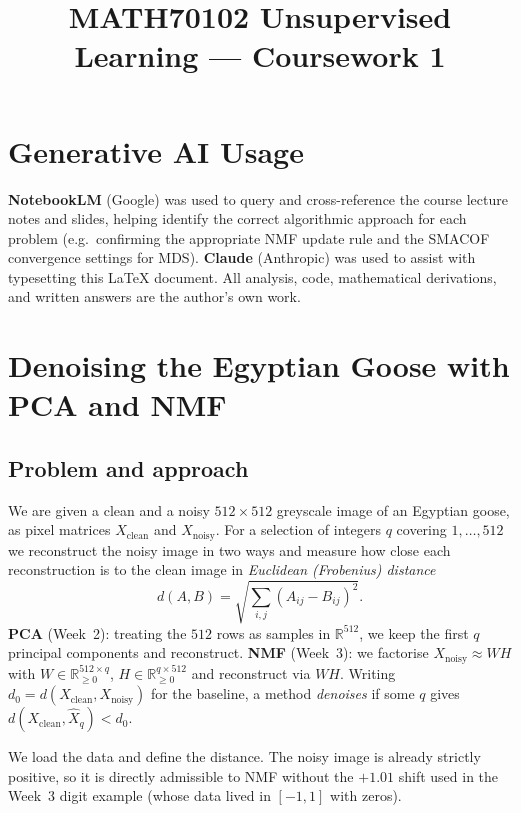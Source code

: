 \documentclass[10pt,a4paper]{article}
\title{\vspace{-1.2cm}\textbf{MATH70102 Unsupervised Learning --- Coursework 1}}
\author{}
\date{}
\begin{document}
\maketitle
\vspace{-1.0cm}

\section*{Generative AI Usage}

\textbf{NotebookLM} (Google) was used to query and cross-reference the course lecture notes and slides, helping identify the correct algorithmic approach for each problem (e.g.\ confirming the appropriate NMF update rule and the SMACOF convergence settings for MDS). \textbf{Claude} (Anthropic) was used to assist with typesetting this \LaTeX{} document. All analysis, code, mathematical derivations, and written answers are the author's own work.

\section{Denoising the Egyptian Goose with PCA and NMF}

\subsection{Problem and approach}

We are given a clean and a noisy $512\times512$ greyscale image of an Egyptian goose, as pixel matrices $X_{\text{clean}}$ and $X_{\text{noisy}}$. For a selection of integers $q$ covering $1,\dots,512$ we reconstruct the noisy image in two ways and measure how close each reconstruction is to the clean image in \emph{Euclidean (Frobenius) distance}
\[
  d(A,B)=\sqrt{\textstyle\sum_{i,j}(A_{ij}-B_{ij})^2}.
\]
\textbf{PCA} (Week~2): treating the $512$ rows as samples in $\mathbb{R}^{512}$, we keep the first $q$ principal components and reconstruct. \textbf{NMF} (Week~3): we factorise $X_{\text{noisy}}\approx WH$ with $W\in\mathbb{R}^{512\times q}_{\ge 0}$, $H\in\mathbb{R}^{q\times 512}_{\ge 0}$ and reconstruct via $WH$. Writing $d_0=d(X_{\text{clean}},X_{\text{noisy}})$ for the baseline, a method \emph{denoises} if some $q$ gives $d(X_{\text{clean}},\hat X_q)<d_0$.

We load the data and define the distance. The noisy image is already strictly positive, so it is directly admissible to NMF without the $+1.01$ shift used in the Week~3 digit example (whose data lived in $[-1,1]$ with zeros).
\end{document}
